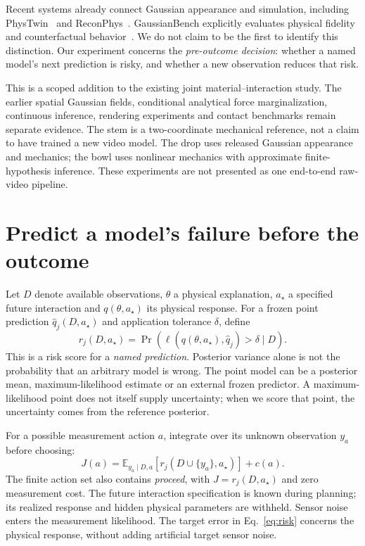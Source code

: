 \documentclass[10pt,twocolumn,letterpaper]{article}
\newcommand{\E}{\mathbb{E}}
\begin{document}
Recent systems already connect Gaussian appearance and simulation, including PhysTwin~\cite{phystwin} and ReconPhys~\cite{reconphys}. GaussianBench explicitly evaluates physical fidelity and counterfactual behavior~\cite{gaussianbench}. We do not claim to be the first to identify this distinction. Our experiment concerns the \emph{pre-outcome decision}: whether a named model's next prediction is risky, and whether a new observation reduces that risk.

This is a scoped addition to the existing joint material--interaction study. The earlier spatial Gaussian fields, conditional analytical force marginalization, continuous inference, rendering experiments and contact benchmarks remain separate evidence. The stem is a two-coordinate mechanical reference, not a claim to have trained a new video model. The drop uses released Gaussian appearance and mechanics; the bowl uses nonlinear mechanics with approximate finite-hypothesis inference. These experiments are not presented as one end-to-end raw-video pipeline.

\section{Predict a model's failure before the outcome}
Let $D$ denote available observations, $\theta$ a physical explanation, $a_\star$ a specified future interaction and $q(\theta,a_\star)$ its physical response. For a frozen point prediction $\hat q_j(D,a_\star)$ and application tolerance $\delta$, define
\begin{equation}
 r_j(D,a_\star)=\Pr\!\left(\ell(q(\theta,a_\star),\hat q_j)>\delta\mid D\right).
 \label{eq:risk}
\end{equation}
This is a risk score for a \emph{named prediction}. Posterior variance alone is not the probability that an arbitrary model is wrong. The point model can be a posterior mean, maximum-likelihood estimate or an external frozen predictor. A maximum-likelihood point does not itself supply uncertainty; when we score that point, the uncertainty comes from the reference posterior.

For a possible measurement action $a$, integrate over its unknown observation $y_a$ before choosing:
\begin{equation}
 J(a)=\E_{y_a\mid D,a}[r_j(D\cup\{y_a\},a_\star)]+c(a).
 \label{eq:design}
\end{equation}
The finite action set also contains \emph{proceed}, with $J=r_j(D,a_\star)$ and zero measurement cost. The future interaction specification is known during planning; its realized response and hidden physical parameters are withheld. Sensor noise enters the measurement likelihood. The target error in Eq.~\ref{eq:risk} concerns the physical response, without adding artificial target sensor noise.
\end{document}
